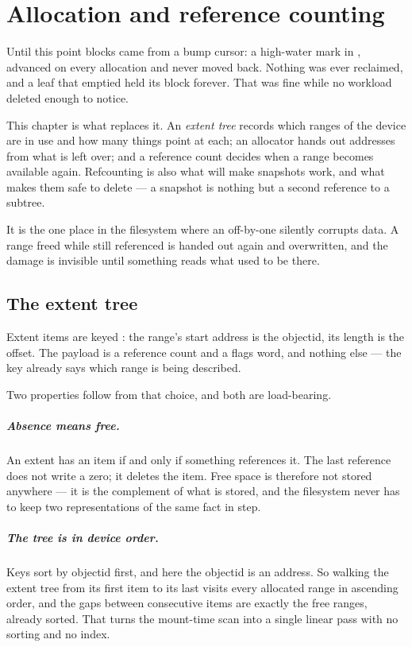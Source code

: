 \chapter{Allocation and reference counting}
\label{ch:extents}

Until this point blocks came from a bump cursor: a high-water mark in
, advanced on every allocation and never moved back.
Nothing was ever reclaimed, and a leaf that emptied held its block forever.
That was fine while no workload deleted enough to notice.

This chapter is what replaces it. An \emph{extent tree} records which ranges of
the device are in use and how many things point at each; an allocator hands out
addresses from what is left over; and a reference count decides when a range
becomes available again. Refcounting is also what will make snapshots work, and
what makes them safe to delete --- a snapshot is nothing but a second reference
to a subtree.

It is the one place in the filesystem where an off-by-one silently corrupts
data. A range freed while still referenced is handed out again and overwritten,
and the damage is invisible until something reads what used to be there.


\section{The extent tree}

Extent items are keyed : the range's
start address is the objectid, its length is the offset. The payload is a
reference count and a flags word, and nothing else --- the key already says
which range is being described.

Two properties follow from that choice, and both are load-bearing.

\paragraph{Absence means free.} An extent has an item if and only if something
references it. The last reference does not write a zero; it deletes the item.
Free space is therefore not stored anywhere --- it is the complement of what is
stored, and the filesystem never has to keep two representations of the same
fact in step.

\paragraph{The tree is in device order.} Keys sort by objectid first, and here
the objectid is an address. So walking the extent tree from its first item to
its last visits every allocated range in ascending order, and the gaps between
consecutive items are exactly the free ranges, already sorted. That turns the
mount-time scan into a single linear pass with no sorting and no index.


